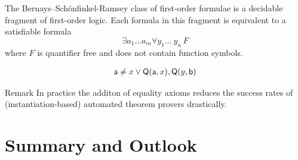 \begin{frame}
		
		
		
		\begin{block}{}
			The Bernays–Schönfinkel-Ramsey class of first-order formulae is a decidable fragment of first-order logic.
			Each formula in this fragment is equivalent to a satisfiable formula
			\[\exists a_1\ldots a_m \forall y_1\ldots\ y_n\,F\] 
			where $F$ is quantifier free and does not contain function symbols.
			
			
		\end{block}
		
		\begin{example}
			\vspace{-1em}
			\begin{gather*}
				{\mathsf a}\neq x\lor{\mathsf Q}({\mathsf a},x), {\mathsf Q}(y,{\mathsf b})
			\end{gather*}
		\end{example}
		
		\begin{block}{Remark}
			In practice the additon of equality axioms reduces the success rates of (instantiation-based) automated theorem provers drastically.
			\end{block}
		
	\end{frame}

\section{Summary and Outlook}



